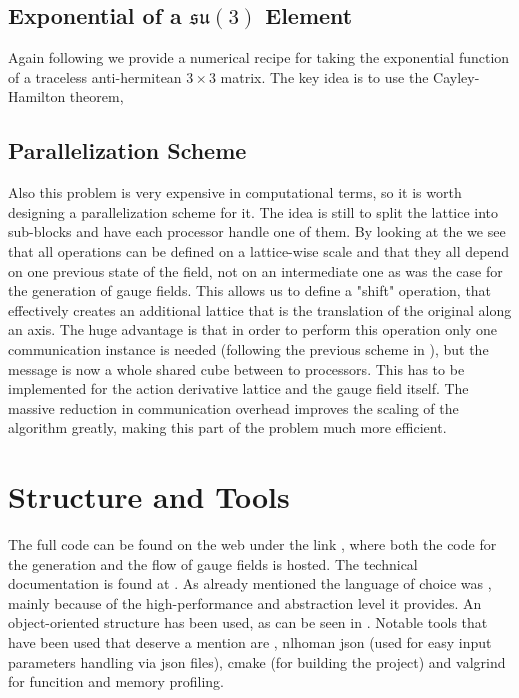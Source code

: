 \subsection{Exponential of a $\mathfrak{su}(3)$ Element}
Again following \CIT we provide a numerical recipe for taking the exponential function of a traceless anti-hermitean $3\times3$ matrix. The key idea is to use the Cayley-Hamilton theorem, 

\subsection{Parallelization Scheme}
Also this problem is very expensive in computational terms, so it is worth designing a parallelization scheme for it. The idea is still to split the lattice into sub-blocks and have each processor handle one of them.
By looking at the \LINK we see that all operations can be defined on a lattice-wise scale and that they all depend on one previous state of the field, not on an intermediate one as was the case for the generation of gauge fields. This allows us to define a "shift" operation, that effectively creates an additional lattice that is the translation of the original along an axis. The huge advantage is that in order to perform this operation only one communication instance is needed (following the previous scheme in \LINK), but the message is now a whole shared cube between to processors.   This has to be implemented for the action derivative lattice and the gauge field itself. The massive reduction in communication overhead improves the scaling of the algorithm greatly, making this part of the problem much more efficient.

\section{Structure and Tools}
The full code can be found on the web under the link , where both the code for the generation and the flow of gauge fields is hosted. The technical documentation is found at . As already mentioned the language of choice was \cpp, mainly because of the high-performance and abstraction level it  provides. An object-oriented structure has been used, as can be seen in . 
Notable tools that have been used that deserve a mention are \mpi, nlhoman json (used for easy input parameters handling via json files), cmake (for building the project) and valgrind for funcition and memory profiling.
